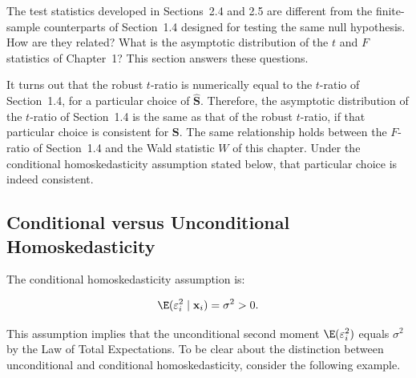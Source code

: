 
The test statistics developed in Sections~2.4 and 2.5 are different from the
finite-sample counterparts of Section~1.4 designed for testing the same null hypothesis.
How are they related?  What is the asymptotic distribution of the $t$ and $F$ statistics
of Chapter~1?  This section answers these questions.

It turns out that the robust $t$-ratio is numerically equal to the $t$-ratio of
Section~1.4, for a particular choice of $\widehat{\mathbf{S}}$.  Therefore, the
asymptotic distribution of the $t$-ratio of Section~1.4 is the same as that of the
robust $t$-ratio, if that particular choice is consistent for $\mathbf{S}$.  The same
relationship holds between the $F$-ratio of Section~1.4 and the Wald statistic $W$ of
this chapter.  Under the conditional homoskedasticity assumption stated below, that
particular choice is indeed consistent.

\subsection*{Conditional versus Unconditional Homoskedasticity}

The conditional homoskedasticity assumption is:

\begin{assumption}
\label{ass:2.7}
\begin{equation}
  \E(\varepsilon_i^2 \mid \mathbf{x}_i) = \sigma^2 > 0.
  \label{eq:2.6.1}
\end{equation}
\end{assumption}

This assumption implies that the unconditional second moment $\E(\varepsilon_i^2)$ equals
$\sigma^2$ by the Law of Total Expectations.  To be clear about the distinction between
unconditional and conditional homoskedasticity, consider the following example.

